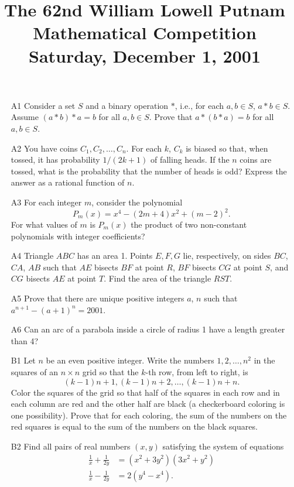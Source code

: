 \documentclass[amssymb,twocolumn,pra,10pt,aps]{revtex4-1}
\begin{document}
\title{The 62nd William Lowell Putnam Mathematical Competition \\
    Saturday, December 1, 2001}
\maketitle

\begin{itemize}
\item[A1]
Consider a set $S$ and a binary operation $*$, i.e., for each $a,b\in S$,
$a*b\in S$.  Assume $(a*b)*a=b$ for all $a,b\in S$.  Prove that
$a*(b*a)=b$ for all $a,b\in S$.

\item[A2]
You have coins $C_1,C_2,\ldots,C_n$.  For each $k$, $C_k$ is biased so
that, when tossed, it has probability $1/(2k+1)$ of falling heads.
If the $n$ coins are tossed, what is the probability that the number of
heads is odd?  Express the answer as a rational function of $n$.

\item[A3]
For each integer $m$, consider the polynomial
\[P_m(x)=x^4-(2m+4)x^2+(m-2)^2.\] For what values of $m$ is $P_m(x)$
the product of two non-constant polynomials with integer coefficients?

\item[A4]
Triangle $ABC$ has an area 1.  Points $E,F,G$ lie, respectively,
on sides $BC$, $CA$, $AB$ such that $AE$ bisects $BF$ at point $R$,
$BF$ bisects $CG$ at point $S$, and $CG$ bisects $AE$ at point $T$.
Find the area of the triangle $RST$.

\item[A5]
Prove that there are unique positive integers $a$, $n$ such that
$a^{n+1}-(a+1)^n=2001$.

\item[A6]
Can an arc of a parabola inside a circle of radius 1 have a length
greater than 4?

\item[B1]
Let $n$ be an even positive integer.  Write the numbers
$1,2,\ldots,n^2$ in the squares of an $n\times n$ grid so that the
$k$-th row, from left to right, is
\[(k-1)n+1,(k-1)n+2,\ldots, (k-1)n+n.\]
Color the squares of the grid so that half of the squares in each
row and in each column are red and the other half are black (a
checkerboard coloring is one possibility).  Prove that for each
coloring, the sum of the numbers on the red squares is equal to
the sum of the numbers on the black squares.

\item[B2]
Find all pairs of real numbers $(x,y)$ satisfying the system
of equations
\begin{align*}
 \frac{1}{x} + \frac{1}{2y} &= (x^2+3y^2)(3x^2+y^2) \\
   \frac{1}{x} - \frac{1}{2y} &= 2(y^4-x^4).
\end{align*}


\end{itemize}
\end{document}
